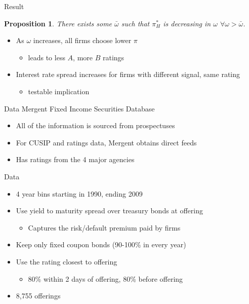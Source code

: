 \documentclass{beamer}
\newtheorem{prop}[theorem]{Proposition}
\begin{document}
\begin{frame}{Result}
\begin{prop}
There exists some $\bar{\omega}$ such that $\pi^{*}_H$ is decreasing in $\omega$ $\forall \omega > \bar{\omega}$.
\end{prop}
\begin{itemize}
	\item As $\omega$ increases, all firms choose lower $\pi$
	\begin{itemize}
		\item leads to less $A$, more $B$ ratings
	\end{itemize}
	\item Interest rate spread increases for firms with different signal, same rating
	\begin{itemize}
		\item testable implication
	\end{itemize}
\end{itemize}
\end{frame}

{


}

\begin{frame}{Data}
Mergent Fixed Income Securities Database
\begin{itemize}
	\item All of the information is sourced from prospectuses
	\item For CUSIP and ratings data, Mergent obtains direct feeds
	\item Has ratings from the 4 major agencies
\end{itemize}
\end{frame}

\begin{frame}{Data}
\begin{itemize}
	\item 4 year bins starting in 1990, ending 2009
	\item Use yield to maturity spread over treasury bonds at offering
	\begin{itemize}
		\item Captures the risk/default premium paid by firms 
	\end{itemize}
	\item Keep only fixed coupon bonds (90-100\% in every year)
	\item Use the rating closest to offering
	\begin{itemize}
		\item 80\% within 2 days of offering, 80\% before offering
	\end{itemize}
	\item 8,755 offerings
\end{itemize}
\end{frame}
\end{document}
